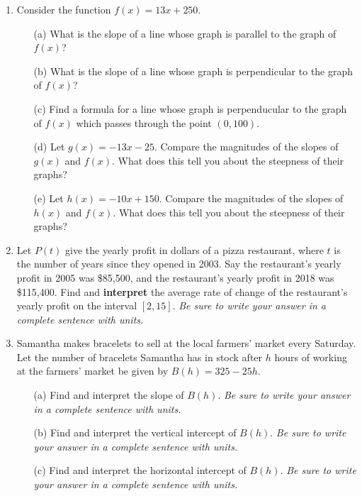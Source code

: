 \documentclass[12pt]{article}
\begin{document}
\begin{enumerate}
\newpage \item Consider the function $f(x)=13x+250$.
\begin{itemize}
	\item[(a)] What is the slope of a line whose graph is parallel to the graph of $f(x)$?
\vfill
	\item[(b)] What is the slope of a line whose graph is perpendicular to the graph of $f(x)$?\vfill
	\item[(c)] Find a formula for a line whose graph is perpenducular to the graph of $f(x)$ which passes through the point $(0, 100)$.\vfill

	\item[(d)] Let $g(x)=-13x-25$. Compare the magnitudes of the slopes of $g(x)$ and $f(x)$. What does this tell you about the steepness of their graphs?\vfill
	\item[(e)] Let $h(x)=-10x+150$. Compare the magnitudes of the slopes of $h(x)$ and $f(x)$. What does this tell you about the steepness of their graphs?\vfill

\end{itemize}

\item Let $P(t)$ give the yearly profit in dollars of a pizza restaurant, where $t$ is the number of years since they opened in 2003. Say the restaurant's yearly profit in 2005 was \$85,500, and the restaurant's yearly profit in 2018 was \$115,400. Find and \textbf{interpret} the average rate of change of the restaurant's yearly profit on the interval $[2,15]$. \textit{Be sure to write your answer in a complete sentence with units.}
\vspace{3in}


\newpage\item Samantha makes bracelets to sell at the local farmers' market every Saturday. Let the number of bracelets Samantha has in stock after $h$ hours of working at the farmers' market be given by $B(h)=325-25h$.
\begin{itemize}
	\item[(a)] Find and interpret the slope of $B(h)$. \textit{Be sure to write your answer in a complete sentence with units.}
\vspace{2in}
	\item[(b)] Find and interpret the vertical intercept of $B(h)$. \textit{Be sure to write your answer in a complete sentence with units.}
\vspace{2in}
	\item[(c)] Find and interpret the horizontal intercept of $B(h)$. \textit{Be sure to write your answer in a complete sentence with units.}
\vspace{2in}
\end{itemize}
\end{enumerate} 
\end{document}
